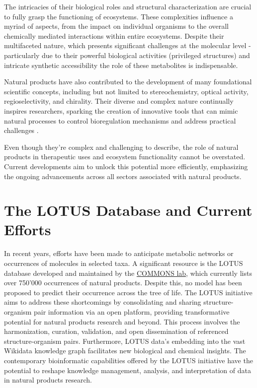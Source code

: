 \documentclass[
11pt, %
english, %
singlespacing, %
headsepline, %
chapterinoneline, %
]{MastersDoctoralThesis} %
\begin{document}
The intricacies of their biological roles and structural characterization are crucial to fully grasp the functioning of ecosystems. These complexities influence a myriad of aspects, from the impact on individual organisms to the overall chemically mediated interactions within entire ecosystems. Despite their multifaceted nature, which presents significant challenges at the molecular level - particularly due to their powerful biological activities (privileged structures) and intricate synthetic accessibility the role of these metabolites is indispensable.

Natural products have also contributed to the development of many foundational scientific concepts, including but not limited to stereochemistry, optical activity, regioselectivity, and chirality. Their diverse and complex nature continually inspires researchers, sparking the creation of innovative tools that can mimic natural processes to control bioregulation mechanisms and address practical challenges \cite{drasarGrowingImportanceNatural2019}.

Even though they're complex and challenging to describe, the role of natural products in therapeutic uses and ecosystem functionality cannot be overstated. Current developments aim to unlock this potential more efficiently, emphasizing the ongoing advancements across all sectors associated with natural products.

\section{The LOTUS Database and Current Efforts}
In recent years, efforts have been made to anticipate metabolic networks or occurrences of molecules in selected taxa. A significant resource is the LOTUS database \cite{rutzLOTUSInitiativeOpen2022} developed and maintained by the \href{https://www.unifr.ch/bio/en/groups/allard/}{COMMONS lab}, which currently lists over 750'000 occurrences of natural products. Despite this, no model has been proposed to predict their occurrence across the tree of life. The LOTUS initiative aims to address these shortcomings by consolidating and sharing structure-organism pair information via an open platform, providing transformative potential for natural products research and beyond. This process involves the harmonization, curation, validation, and open dissemination of referenced structure-organism pairs. Furthermore, LOTUS data's embedding into the vast Wikidata knowledge graph facilitates new biological and chemical insights. The contemporary bioinformatic capabilities offered by the LOTUS initiative have the potential to reshape knowledge management, analysis, and interpretation of data in natural products research.
\end{document}
